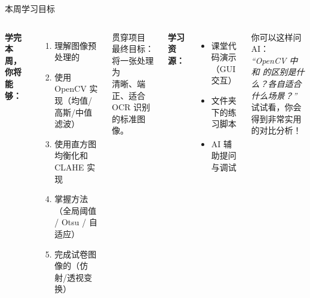 \begin{frame}{本周学习目标}
    \begin{columns}[t]
        \textbf{学完本周，你将能够：}
        \begin{enumerate}
            \item 理解图像预处理的
            \item 使用 OpenCV 实现（均值/高斯/中值滤波）
            \item 使用直方图均衡化和 CLAHE 实现
            \item 掌握方法（全局阈值 / Otsu / 自适应）
            \item 完成试卷图像的（仿射/透视变换）
        \end{enumerate}

        \vspace{0.3cm}
        \begin{block}{贯穿项目}
            最终目标：将一张处理为\\
            清晰、端正、适合 OCR 识别的标准图像。
        \end{block}

        \textbf{学习资源：}
        \begin{itemize}
            \item 课堂代码演示（GUI交互）
            \item {} 文件夹下的练习脚本
            \item AI 辅助提问与调试
        \end{itemize}

        \vspace{0.3cm}
        \begin{tcolorbox}[
            colback=blue!5,
            colframe=blue!60!black,
            title={\small AI 辅助提示},
            fonttitle=\bfseries\small,
            boxrule=0.8pt,
            arc=2pt
        ]
            \small
            你可以这样问 AI：\\[0.15cm]
            \textit{``OpenCV 中  和  的区别是什么？各自适合什么场景？''}\\[0.15cm]
            试试看，你会得到非常实用的对比分析！
        \end{tcolorbox}
    \end{columns}
\end{frame}
